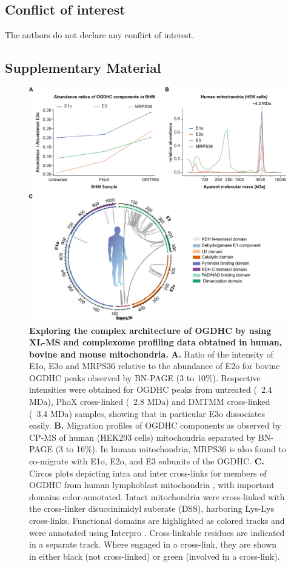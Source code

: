 \subsection*{Conflict of interest}
The authors do not declare any conflict of interest.

\clearpage
\begin{subappendices}
    \section{Supplementary Material}

    \begin{figure}[hbt!]
        \center
        \includegraphics[width=\textwidth]{Chapter.5/Figures/Figure_S1.png} 
        \caption{\textbf{Exploring the complex architecture of OGDHC by using XL-MS and complexome profiling data obtained in human, bovine and mouse mitochondria.} \textbf{A.} Ratio of the intensity of E1o, E3o and MRPS36 relative to the abundance of E2o for bovine OGDHC peaks observed by BN-PAGE (3 to 10\%). Respective intensities were obtained for OGDHC peaks from untreated (~2.4 MDa), PhoX cross-linked (~2.8 MDa) and DMTMM cross-linked (~3.4 MDa) samples, showing that in particular E3o dissociates easily. \textbf{B.} Migration profiles of OGDHC components as observed by CP-MS of human (HEK293 cells) mitochondria separated by BN-PAGE (3 to 16\%). In human mitochondria, MRPS36 is also found to co-migrate with E1o, E2o, and E3 subunits of the OGDHC. \textbf{C.} Circos plots depicting intra and inter cross-links for members of OGDHC from human lymphoblast mitochondria \cite{Ryl_2020}, with important domains color-annotated. Intact mitochondria were cross-linked with the cross-linker disuccinimidyl suberate (DSS), harboring Lys-Lys cross-links. Functional domains are highlighted as colored tracks and were annotated using Interpro \cite{Blum_2021}. Cross-linkable residues are indicated in a separate track. Where engaged in a cross-link, they are shown in either black (not cross-linked) or green (involved in a cross-link).}

\end{figure}
\end{subappendices}
